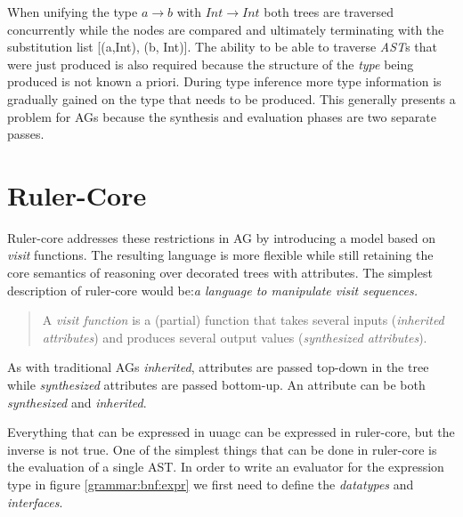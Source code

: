 \documentclass[twoside, titlepage, openright, a4paper]{book}
\begin{document}
When unifying the type \emph{$a \rightarrow b$} with \emph{$Int \rightarrow Int$} both trees are traversed concurrently while the nodes are compared and ultimately terminating with the substitution list [(a,Int), (b, Int)]. The ability to be able to traverse \emph{AST}s that were just produced is also required because the structure of the \emph{type} being produced is not known a priori. During type inference more type information is gradually gained on the type that needs to be produced. This generally presents a problem for AGs\cite{ruler-front} because the synthesis and evaluation phases are two separate passes.

\section{Ruler-Core}
Ruler-core addresses these restrictions in AG by introducing a model based on \emph{visit}\cite{visits} functions. The resulting language is more flexible while still retaining the core semantics of reasoning over decorated trees with attributes. The simplest description of ruler-core would be:\emph{a language to manipulate visit sequences.}

\begin{quotation}
A \emph{visit function}\cite{visitag} is a (partial) function that takes several inputs (\emph{inherited attributes}) and produces several output values (\emph{synthesized attributes}).
\end{quotation}

As with traditional AGs \emph{inherited}, attributes are passed top-down in the tree while \emph{synthesized} attributes are passed bottom-up. An attribute can be both \emph{synthesized} and \emph{inherited}.

Everything that can be expressed in uuagc can be expressed in ruler-core, but the inverse is not true. One of the simplest things that can be done in ruler-core is the evaluation of a single AST. In order to write an evaluator for the expression type in figure \ref{grammar:bnf:expr} we first need to define the \emph{datatypes} and \emph{interfaces}.
\end{document}

